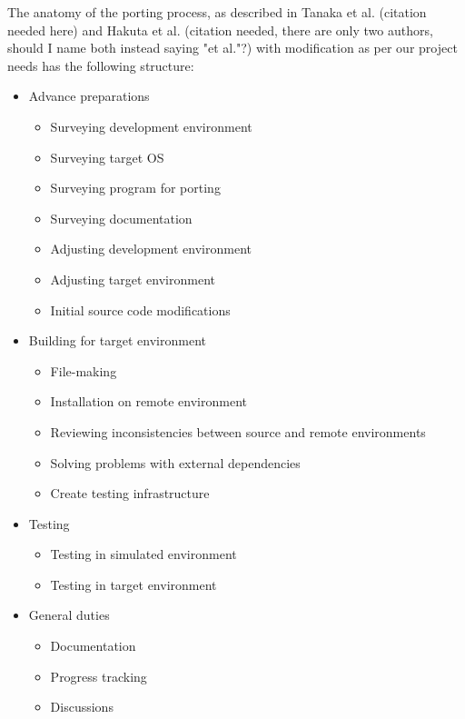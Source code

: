 The anatomy of the porting process, as described in Tanaka et al. (citation
needed here) and Hakuta et al. (citation needed, there are only two authors,
should I name both instead saying "et al."?) with modification as per our
project needs has the following structure:
\begin{itemize}
    \item Advance preparations
        \begin{itemize}
            \item Surveying development environment
            \item Surveying target OS
            \item Surveying program for porting
            \item Surveying documentation
            \item Adjusting development environment
            \item Adjusting target environment
            \item Initial source code modifications
        \end{itemize}
    \item Building for target environment
        \begin{itemize}
            \item File-making
            \item Installation on remote environment
            \item Reviewing inconsistencies between source and remote environments
            \item Solving problems with external dependencies
            \item Create testing infrastructure
        \end{itemize}
    \item Testing
        \begin{itemize}
            \item Testing in simulated environment
            \item Testing in target environment
        \end{itemize}
    \item General duties
        \begin{itemize}
            \item Documentation
            \item Progress tracking
            \item Discussions
        \end{itemize}
\end{itemize}


